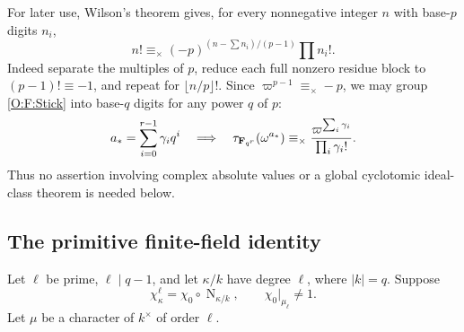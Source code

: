 \documentclass[11pt]{amsart}
\theoremstyle{definition}
\theoremstyle{remark}
\newcommand{\Nm}{\operatorname{N}}
\begin{document}
For later use, Wilson's theorem gives, for every nonnegative integer
$n$ with base-$p$ digits $n_i$,
\[
 n!\equiv_\times(-p)^{(n-\sum n_i)/(p-1)}\prod n_i!.
\]
Indeed separate the multiples of $p$, reduce each full nonzero residue
block to $(p-1)!\equiv-1$, and repeat for $\lfloor n/p\rfloor!$.
Since $\varpi^{p-1}\equiv_\times-p$, we may group \eqref{O:F:Stick}
into base-$q$ digits for any power $q$ of $p$:
\begin{equation}\label{O:F:groupedStick}
 a_*=\sum_{i=0}^{r-1}\gamma_iq^i
 \quad\Longrightarrow\quad
 \tau_{\mathbf F_{q^r}}(\omega^{a_*})
 \equiv_\times\frac{\varpi^{\sum_i\gamma_i}}{\prod_i\gamma_i!}.
\end{equation}
Thus no assertion involving complex absolute values or a global
cyclotomic ideal-class theorem is needed below.

\subsection{The primitive finite-field identity}
Let $\ell$ be prime, $\ell\mid q-1$, and let $\kappa/k$ have degree
$\ell$, where $|k|=q$. Suppose
\begin{equation}\label{O:F:finitecompatible}
 \chi_\kappa^\ell=\chi_0\circ\Nm_{\kappa/k},
 \qquad \chi_0|_{\mu_\ell}\ne1.
\end{equation}
Let $\mu$ be a character of $k^\times$ of order $\ell$.
\end{document}

